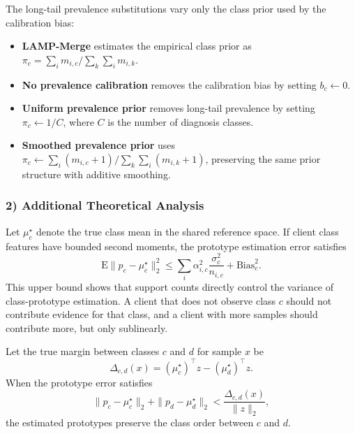 \documentclass[letterpaper]{article} %
\begin{document}
The long-tail prevalence substitutions vary only the class prior used by the calibration bias:
\begin{itemize}
\setlength{\itemsep}{0pt}
\item \textbf{LAMP-Merge} estimates the empirical class prior as \(\pi_c=\sum_i m_{i,c}/\sum_k\sum_i m_{i,k}\).
\item \textbf{No prevalence calibration} removes the calibration bias by setting \(b_c\leftarrow0\).
\item \textbf{Uniform prevalence prior} removes long-tail prevalence by setting \(\pi_c\leftarrow 1/C\), where \(C\) is the number of diagnosis classes.
\item \textbf{Smoothed prevalence prior} uses \(\pi_c\leftarrow\sum_i(m_{i,c}+1)/\sum_k\sum_i(m_{i,k}+1)\), preserving the same prior structure with additive smoothing.
\end{itemize}

\subsubsection{2) Additional Theoretical Analysis}
Let $\mu_c^\star$ denote the true class mean in the shared reference space. If client class features have bounded second moments, the prototype estimation error satisfies
\begin{equation}
\mathrm{E}\|p_c-\mu_c^\star\|_2^2
\le
\sum_i \alpha_{i,c}^2\frac{\sigma_c^2}{n_{i,c}}
+ \mathrm{Bias}_c^2.
\end{equation}
This upper bound shows that support counts directly control the variance of class-prototype estimation. A client that does not observe class $c$ should not contribute evidence for that class, and a client with more samples should contribute more, but only sublinearly.

Let the true margin between classes $c$ and $d$ for sample $x$ be
\begin{equation}
\Delta_{c,d}(x)=(\mu_c^\star)^\top z-(\mu_d^\star)^\top z.
\end{equation}
When the prototype error satisfies
\begin{equation}
\|p_c-\mu_c^\star\|_2+\|p_d-\mu_d^\star\|_2
<
\frac{\Delta_{c,d}(x)}{\|z\|_2},
\end{equation}
the estimated prototypes preserve the class order between $c$ and $d$.
\end{document}
